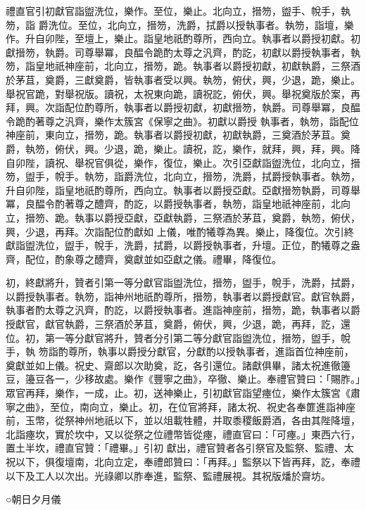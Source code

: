 \begin{pinyinscope}
 禮直官引初獻官詣盥洗位，樂作。至位，樂止。北向立，搢笏，盥手、帨手，執笏，詣
 爵洗位。至位，北向立，搢笏，洗爵，拭爵以授執事者。執笏，詣壇，樂作。升自卯陛，至壇上，樂止。詣皇地祇酌尊所，西向立。執事者以爵授初獻。初獻搢笏，執爵。司尊舉冪，良醖令跪酌太尊之汎齊，酌訖，初獻以爵授執事者，執笏，詣皇地祇神座前，北向立，搢笏，跪。執事者以爵授初獻，初獻執爵，三祭酒於茅苴，奠爵，三獻奠爵，皆執事者受以興。執笏，俯伏，興，少退，跪，樂止。舉祝官跪，對舉祝版。讀祝，太祝東向跪，讀祝訖，俯伏，興。舉祝奠版於案，再拜，興。次詣配位酌尊所，執事者以爵授初獻，初獻搢笏，執爵。司尊舉冪，良醖令跪酌著尊之汎齊，樂作太簇宮《保寧之曲》。初獻以爵授
 執事者，執笏，詣配位神座前，東向立，搢笏，跪。執事者以爵授初獻，初獻執爵，三奠酒於茅苴。奠爵，執笏，俯伏，興。少退，跪，樂止。讀祝，訖，樂作，就拜，興，拜，興。降自卯陛，讀祝、舉祝官俱從，樂作，復位，樂止。次引亞獻詣盥洗位，北向立，搢笏，盥手，帨手。執笏，詣爵洗位，北向立，搢笏，洗爵，拭爵授執事者。執笏，升自卯陛，詣皇地祇酌尊所，西向立。執事者以爵授亞獻。亞獻搢笏執爵，司尊舉冪，良醖令酌著尊之醴齊，酌訖，以爵授執事者，執笏，詣皇地祇神座前，北向立，搢笏、跪。執事以爵授亞獻，亞獻執爵，三祭酒於茅苴，奠爵，執笏，俯伏，興，少退，再拜。次詣配位酌獻如
 上儀，唯酌犧尊為異。樂止，降復位。次引終獻詣盥洗位，盥手，帨手，洗爵，拭爵，以爵授執事者，升壇。正位，酌犧尊之盎齊，配位，酌象尊之醴齊，奠獻並如亞獻之儀。禮畢，降復位。



 初，終獻將升，贊者引第一等分獻官詣盥洗位，搢笏，盥手，帨手，洗爵，拭爵，以爵授執事者。執笏，詣神州地祇酌尊所，搢笏，執事者以爵授獻官。獻官執爵，執事者酌太尊之汎齊，酌訖，以爵授執事者。進詣神座前，搢笏，跪，執事者以爵授獻官，獻官執爵，三祭酒於茅苴，奠爵，俯伏，興，少退，跪，再拜，訖，還位。初，第一等分獻官將升，贊者分引第二等分獻官詣盥洗位，搢笏，盥手，帨手，執
 笏詣酌尊所，執事以爵授分獻官，分獻酌以授執事者，進詣首位神座前，奠獻並如上儀。祝史、齋郎以次助奠，訖，各引還位。諸獻俱畢，諸太祝進徹籩豆，籩豆各一，少移故處。樂作《豐寧之曲》，卒徹、樂止。奉禮官贊曰：「賜胙。」眾官再拜，樂作，一成，止。初，送神樂止，引初獻官詣望瘞位，樂作太簇宮《肅寧之曲》，至位，南向立，樂止。初，在位官將拜，諸太祝、祝史各奉篚進詣神座前，玉幣，從祭神州地祇以下，並以俎載牲體，并取黍稷飯爵酒，各由其陛降壇，北詣瘞坎，實於坎中，又以從祭之位禮幣皆從瘞，禮直官曰：「可瘞。」東西六行，置土半坎，禮直官贊：「禮畢。」引初
 獻出，禮官贊者各引祭官及監祭、監禮、太祝以下，俱復壇南，北向立定，奉禮郎贊曰：「再拜。」監祭以下皆再拜，訖，奉禮以下及工人以次出。光祿卿以胙奉進，監祭、監禮展視。其祝版燔於齋坊。



 ○朝日夕月儀




\end{pinyinscope}
